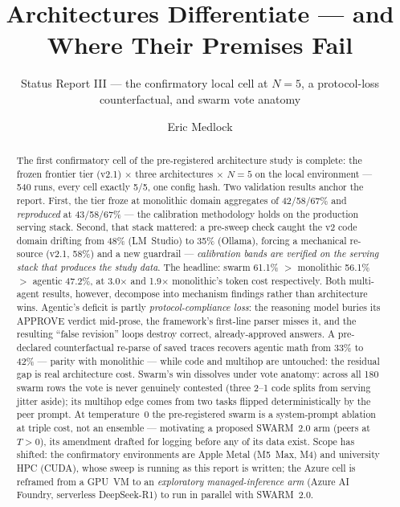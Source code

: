 \documentclass[sigconf,nonacm]{acmart}
\begin{document}
\title{Architectures Differentiate --- and Where Their Premises Fail}
\subtitle{Status Report III --- the confirmatory local cell at $N{=}5$, a protocol-loss counterfactual, and swarm vote anatomy}

\author{Eric Medlock}

\begin{abstract}
The first confirmatory cell of the pre-registered architecture study is complete: the
frozen frontier tier (v2.1) $\times$ three architectures $\times$ $N{=}5$ on the local
environment --- 540 runs, every cell exactly 5/5, one config hash. Two validation
results anchor the report. First, the tier froze at monolithic domain aggregates of
42/58/67\% and \emph{reproduced} at 43/58/67\% --- the calibration methodology holds on
the production serving stack. Second, that stack mattered: a pre-sweep check caught the
v2 code domain drifting from 48\% (LM~Studio) to 35\% (Ollama), forcing a mechanical
re-source (v2.1, 58\%) and a new guardrail --- \emph{calibration bands are verified on
the serving stack that produces the study data}. The headline: swarm 61.1\% $>$
monolithic 56.1\% $>$ agentic 47.2\%, at 3.0$\times$ and 1.9$\times$ monolithic's token
cost respectively. Both multi-agent results, however, decompose into mechanism findings
rather than architecture wins. Agentic's deficit is partly \emph{protocol-compliance
loss}: the reasoning model buries its APPROVE verdict mid-prose, the framework's
first-line parser misses it, and the resulting ``false revision'' loops destroy
correct, already-approved answers. A pre-declared counterfactual re-parse of saved
traces recovers agentic math from 33\% to 42\% --- parity with monolithic --- while
code and multihop are untouched: the residual gap is real architecture cost. Swarm's
win dissolves under vote anatomy: across all 180 swarm rows the vote is never
genuinely contested (three 2--1 code splits from serving jitter aside); its multihop
edge comes from two tasks flipped deterministically by the peer prompt. At
temperature~0 the pre-registered swarm is a system-prompt ablation at triple cost, not
an ensemble --- motivating a proposed SWARM~2.0 arm (peers at $T{>}0$), its amendment
drafted for logging before any of its data exist. Scope has shifted: the confirmatory
environments are Apple Metal (M5~Max, M4) and university HPC (CUDA), whose sweep is
running as this report is written; the Azure cell is reframed from a GPU~VM to an
\emph{exploratory managed-inference arm} (Azure AI Foundry, serverless DeepSeek-R1)
to run in parallel with SWARM~2.0.
\end{abstract}
\end{document}
